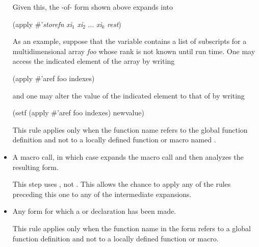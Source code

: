 \begin{defmac}
\begin{itemize}
Given this, the -of- form shown above expands into
\begin{lisp}
(apply \#'\emph{storefn} \emph{xi${}_1$} \emph{xi${}_2$} ... \emph{xi${}_k$} \emph{rest})
\end{lisp}
As an example, suppose that the variable  contains a list
of subscripts for a multidimensional array \emph{foo} whose rank is not
known until run time.  One may access the indicated
element of the array by writing
\begin{lisp}
(apply \#'aref foo indexes)
\end{lisp}
and one may alter the value of the indicated element to that
of  by writing
\begin{lisp}
(setf (apply \#'aref foo indexes) newvalue)
\end{lisp}

This
rule applies only when the function name  refers to the global function
definition and not to a locally defined function or macro named .

\item
A macro call, in which case  expands the macro call and
then analyzes the resulting form.

This
step uses , not .  This allows the chance
to apply any of the rules preceding this one to any of the intermediate expansions.

\item
Any form for which a 
or  declaration has been made.

This
rule applies only when the function name in the form refers to a global function
definition and not to a locally defined function or macro.

\end{itemize}


\end{defmac}
